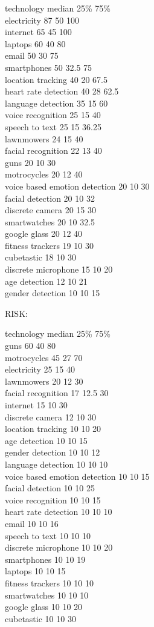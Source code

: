 \documentclass{acm_proc_article-sp}
\begin{document}
technology 	median	25\%		75\% \\
electricity	87	50	100\\
internet	65	45	100\\
laptops	60	40	80\\
email	50	30	75\\
smartphones	50	32.5	75\\
location tracking	40	20	67.5\\
heart rate detection	40	28	62.5\\
language detection	35	15	60\\
voice recognition	25	15	40\\
speech to text	25	15	36.25\\
lawnmowers	24	15	40\\
facial recognition	22	13	40\\
guns	20	10	30\\
motrocycles	20	12	40\\
voice based emotion detection	20	10	30\\
facial detection	20	10	32\\
discrete camera	20	15	30\\
smartwatches	20	10	32.5\\
google glass	20	12	40\\
fitness trackers	19	10	30\\
cubetastic	18	10	30\\
discrete microphone	15	10	20\\
age detection	12	10	21\\
gender detection	10	10	15

RISK: 

technology 	median	25\%		75\%\\
guns	60	40	80\\
motrocycles	45	27	70\\
electricity	25	15	40\\
lawnmowers	20	12	30\\
facial recognition	17	12.5	30\\
internet	15	10	30\\
discrete camera	12	10	30\\
location tracking	10	10	20\\
age detection	10	10	15\\
gender detection	10	10	12\\
language detection	10	10	10\\
voice based emotion detection	10	10	15\\
facial detection	10	10	25\\
voice recognition	10	10	15\\
heart rate detection	10	10	10\\
email	10	10	16\\
speech to text	10	10	10\\
discrete microphone	10	10	20\\
smartphones	10	10	19\\
laptops	10	10	15\\
fitness trackers	10	10	10\\
smartwatches	10	10	10\\
google glass	10	10	20\\
cubetastic	10	10	30
\end{document}
